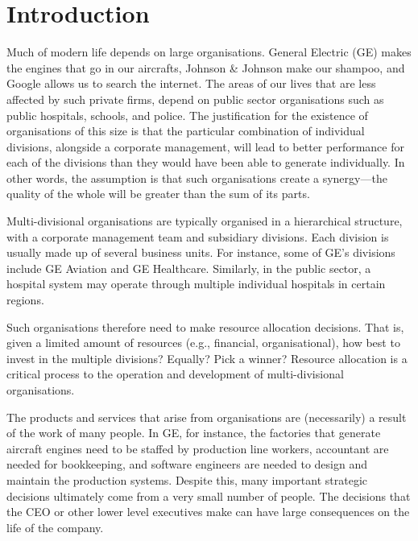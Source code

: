 \documentclass[a4paper, nobind, dvipsnames]{templates/ociamthesis}
\theoremstyle{definition}
\theoremstyle{definition}
\theoremstyle{definition}
\theoremstyle{definition}
\theoremstyle{remark}
\begin{document}
\hypertarget{introduction}{%
\chapter{Introduction}\label{introduction}}

\minitoc

Much of modern life depends on large organisations. General Electric (GE) makes
the engines that go in our aircrafts, Johnson \& Johnson make our shampoo, and
Google allows us to search the internet. The areas of our lives that are less
affected by such private firms, depend on public sector organisations such as
public hospitals, schools, and police. The justification for the existence of
organisations of this size is that the particular combination of individual
divisions, alongside a corporate management, will lead to better performance for
each of the divisions than they would have been able to generate individually.
In other words, the assumption is that such organisations create a synergy---the
quality of the whole will be greater than the sum of its parts.

Multi-divisional organisations are typically organised in a hierarchical
structure, with a corporate management team and subsidiary divisions. Each
division is usually made up of several business units. For instance, some of
GE's divisions include GE Aviation and GE Healthcare. Similarly, in the public
sector, a hospital system may operate through multiple individual hospitals in
certain regions.

Such organisations therefore need to make resource allocation decisions. That
is, given a limited amount of resources (e.g., financial, organisational), how
best to invest in the multiple divisions? Equally? Pick a winner? Resource
allocation is a critical process to the operation and development of
multi-divisional organisations.

The products and services that arise from organisations are (necessarily) a
result of the work of many people. In GE, for instance, the factories that
generate aircraft engines need to be staffed by production line workers,
accountant are needed for bookkeeping, and software engineers are needed to
design and maintain the production systems. Despite this, many important
strategic decisions ultimately come from a very small number of people. The
decisions that the CEO or other lower level executives make can have large
consequences on the life of the company.
\end{document}
